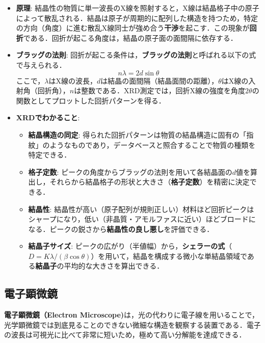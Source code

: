 \documentclass[11pt,a4paper]{ltjsarticle}
\newcommand{\supcite}[1]{\textsuperscript{\cite{#1}}}
\begin{document}
\begin{itemize}
\item \textbf{原理}: 結晶性の物質に単一波長のX線を照射すると，X線は結晶格子中の原子によって散乱される．結晶は原子が周期的に配列した構造を持つため，特定の方向（角度）に進む散乱X線同士が強め合う\textbf{干渉}を起こす．この現象が\textbf{回折}である．回折が起こる角度は，結晶の原子面の面間隔に依存する\supcite{ref1}．

\item \textbf{ブラッグの法則}: 回折が起こる条件は，\textbf{ブラッグの法則}と呼ばれる以下の式で与えられる\supcite{ref1}．
  \begin{equation}
  n\lambda = 2d\sin\theta
  \end{equation}
  ここで，$\lambda$はX線の波長，$d$は結晶の面間隔（結晶面間の距離），$\theta$はX線の入射角（回折角），$n$は整数である．XRD測定では，回折X線の強度を角度$2\theta$の関数としてプロットした回折パターンを得る．

\item \textbf{XRDでわかること}:
  \begin{itemize}
  \item \textbf{結晶構造の同定}: 得られた回折パターンは物質の結晶構造に固有の「指紋」のようなものであり，データベースと照合することで物質の種類を特定できる\supcite{ref1}．
  \item \textbf{格子定数}: ピークの角度からブラッグの法則を用いて各結晶面の$d$値を算出し，それらから結晶格子の形状と大きさ（\textbf{格子定数}）を精密に決定できる\supcite{ref1}．
  \item \textbf{結晶性}: 結晶性が高い（原子配列が規則正しい）材料ほど回折ピークはシャープになり，低い（非晶質・アモルファスに近い）ほどブロードになる．ピークの鋭さから\textbf{結晶性の良し悪し}を評価できる\supcite{ref1}．
  \item \textbf{結晶子サイズ}: ピークの広がり（半値幅）から，\textbf{シェラーの式}（$D=K\lambda/(\beta\cos\theta)$）を用いて，結晶を構成する微小な単結晶領域である\textbf{結晶子}の平均的な大きさを算出できる\supcite{ref1}．
  \end{itemize}
\end{itemize}

\subsection{電子顕微鏡}

\textbf{電子顕微鏡（Electron Microscope)}は，光の代わりに電子線を用いることで，光学顕微鏡では到底見ることのできない微細な構造を観察する装置である．電子の波長は可視光に比べて非常に短いため，極めて高い分解能を達成できる\supcite{ref1}．
\end{document}
